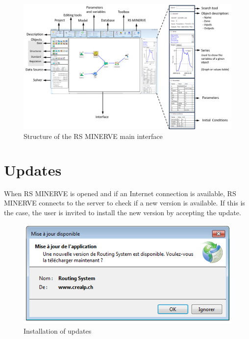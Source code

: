 \documentclass[
  letterpaper,
  DIV=11,
  numbers=noendperiod]{scrreprt}
\begin{document}
\begin{figure}

{\centering \includegraphics{./figures/fig-rsm_interface.png}

}

\caption{\label{fig-rsm_interface}Structure of the RS MINERVE main
interface}

\end{figure}

\hypertarget{updates}{%
\chapter{Updates}\label{updates}}

When RS MINERVE is opened and if an Internet connection is available, RS
MINERVE connects to the server to check if a new version is available.
If this is the case, the user is invited to install the new version by
accepting the update.

\begin{figure}

{\centering \includegraphics{./figures/fig-installation_updates.png}

}

\caption{\label{fig-installation_updates}Installation of updates}

\end{figure}
\end{document}
